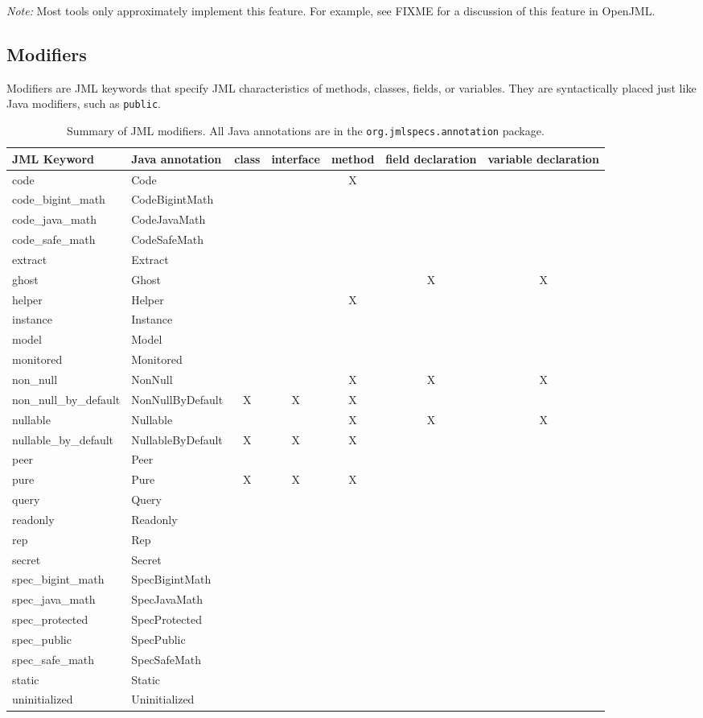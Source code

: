 \textit{Note:} Most tools only approximately implement this feature. For example, see FIXME for a discussion of this feature in OpenJML.


\subsection{Modifiers}
\label{modifiers}

Modifiers are JML keywords that specify JML characteristics of methods, classes, fields, or variables. They are syntactically placed just like Java modifiers, such as \texttt{public}.

\begin{table}
\begin{tabular}{|l|l|c|c|c|c|c|}
\hline
JML Keyword & Java annotation & class & interface & method & field declaration & variable declaration \\
\hline
code & Code & & & X & & \\
code\_bigint\_math & CodeBigintMath & \\
code\_java\_math & CodeJavaMath & \\
code\_safe\_math & CodeSafeMath & \\
extract & Extract & \\
ghost & Ghost & & & & X & X \\
helper & Helper & & & X & & \\
instance & Instance & \\
model & Model & \\
monitored & Monitored & \\
non\_null & NonNull &  & & X & X & X \\
non\_null\_by\_default & NonNullByDefault & X & X & X & & \\
nullable & Nullable & & & X & X & X \\
nullable\_by\_default & NullableByDefault & X & X & X & &  \\
peer & Peer & \\
pure & Pure & X & X & X & & \\
query & Query & \\
readonly & Readonly & \\
rep & Rep & \\
secret & Secret & \\
spec\_bigint\_math & SpecBigintMath & \\
spec\_java\_math & SpecJavaMath & \\
spec\_protected & SpecProtected & \\
spec\_public & SpecPublic & \\
spec\_safe\_math & SpecSafeMath & \\
static & Static & \\
uninitialized & Uninitialized & \\

\hline
\end{tabular}
\caption{Summary of JML modifiers. All Java annotations are in the \texttt{org.jmlspecs.annotation} package.}
\label{Tab:modifiers}
\end{table}

